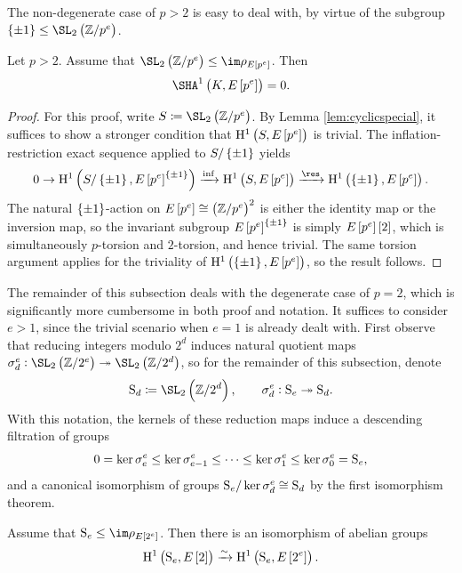 The non-degenerate case of $ p > 2 $ is easy to deal with, by virtue of the subgroup $ \cbr{\pm 1} \le \SL_2\br{\ZZ / p^e} $.

\begin{proposition}
\label{prop:vanishinggeneral}
Let $ p > 2 $. Assume that $ \SL_2\br{\ZZ / p^e} \le \im \rho_{E\sbr{p^e}} $. Then
$$ \Sha[K, E\sbr{p^e}] = 0. $$
\end{proposition}

\begin{proof}
For this proof, write $ S \coloneqq \SL_2\br{\ZZ / p^e} $. By Lemma \ref{lem:cyclicspecial}, it suffices to show a stronger condition that $ \HE[p^e]{S} $ is trivial. The inflation-restriction exact sequence applied to $ S / \cbr{\pm 1} $ yields
$$ 0 \to \H^1\br{S / \cbr{\pm 1}, E\sbr{p^e}^{\cbr{\pm 1}}} \xrightarrow{\inf} \HE[p^e]{S} \xrightarrow{\res} \HE[p^e]{\cbr{\pm 1}}. $$
The natural $ \cbr{\pm 1} $-action on $ E\sbr{p^e} \cong \br{\ZZ / p^e}^2 $ is either the identity map or the inversion map, so the invariant subgroup $ E\sbr{p^e}^{\cbr{\pm 1}} $ is simply $ E\sbr{p^e}\sbr{2} $, which is simultaneously $ p $-torsion and $ 2 $-torsion, and hence trivial. The same torsion argument applies for the triviality of $ \HE[p^e]{\cbr{\pm 1}} $, so the result follows.
\end{proof}

The remainder of this subsection deals with the degenerate case of $ p = 2 $, which is significantly more cumbersome in both proof and notation. It suffices to consider $ e > 1 $, since the trivial scenario when $ e = 1 $ is already dealt with. First observe that reducing integers modulo $ 2^d $ induces natural quotient maps $ \sigma_d^e : \SL_2\br{\ZZ / 2^e} \twoheadrightarrow \SL_2\br{\ZZ / 2^d} $, so for the remainder of this subsection, denote
$$ \S_d \coloneqq \SL_2\br{\ZZ / 2^d}, \qquad \sigma_d^e : \S_e \twoheadrightarrow \S_d. $$
With this notation, the kernels of these reduction maps induce a descending filtration of groups
$$ 0 = \ker \sigma_e^e \le \ker \sigma_{e - 1}^e \le \dots \le \ker \sigma_1^e \le \ker \sigma_0^e = \S_e, $$
and a canonical isomorphism of groups $ \S_e / \ker \sigma_d^e \cong \S_d $ by the first isomorphism theorem.

\pagebreak

\begin{lemma}
\label{lem:twotorsion}
Assume that $ \S_e \le \im \rho_{E\sbr{2^e}} $. Then there is an isomorphism of abelian groups
$$ \HE[2]{\S_e} \xrightarrow{\sim} \HE[2^e]{\S_e}. $$
\end{lemma}

